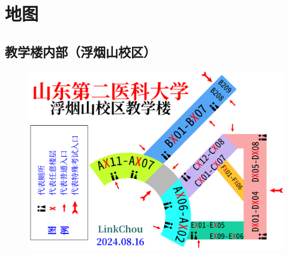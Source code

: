 
\section[地图]{地图\footnotemark}

\subsection[教学楼内部（浮烟山校区）]{教学楼内部（浮烟山校区）}
\begin{figure}[H]
    \centering
    \includegraphics*[width=\textwidth]{resources/map/浮烟山校区教学楼.pdf}
    \label{map_fuyanshan_teach_building}
\end{figure}

\newpage
